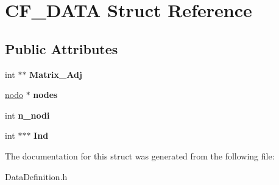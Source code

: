 \hypertarget{structCF__DATA}{\section{C\-F\-\_\-\-D\-A\-T\-A Struct Reference}
\label{structCF__DATA}
}
\subsection*{Public Attributes}
\begin{DoxyCompactItemize}
\item 
\hypertarget{structCF__DATA_a33150ceb864cb8ff1fcf8bfbb2d01efe}{int $\ast$$\ast$ {\bfseries Matrix\-\_\-\-Adj}}\label{structCF__DATA_a33150ceb864cb8ff1fcf8bfbb2d01efe}

\item 
\hypertarget{structCF__DATA_aa790d2fc6304b584e3d6a5afb95cf5c4}{\hyperlink{structNODO}{nodo} $\ast$ {\bfseries nodes}}\label{structCF__DATA_aa790d2fc6304b584e3d6a5afb95cf5c4}

\item 
\hypertarget{structCF__DATA_a50c302ea5a7570881d844eb0b2a6c930}{int {\bfseries n\-\_\-nodi}}\label{structCF__DATA_a50c302ea5a7570881d844eb0b2a6c930}

\item 
\hypertarget{structCF__DATA_a21b2ca110fc0b01950a783ef9e9c2628}{int $\ast$$\ast$$\ast$ {\bfseries Ind}}\label{structCF__DATA_a21b2ca110fc0b01950a783ef9e9c2628}

\end{DoxyCompactItemize}


The documentation for this struct was generated from the following file\-:\begin{DoxyCompactItemize}
\item 
Data\-Definition.\-h\end{DoxyCompactItemize}
